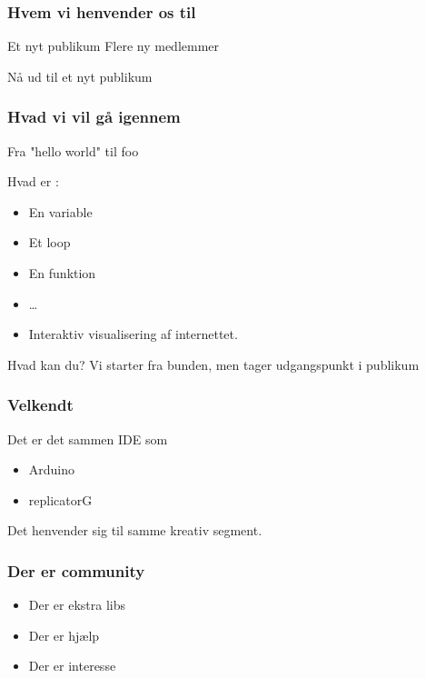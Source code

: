 \documentclass{beamer}
\begin{document}
\begin{frame}
  \frametitle{Hvem vi henvender os til}
  \begin{block}{Et nyt publikum}
    Flere ny medlemmer 

    Nå ud til et nyt publikum

\end{block}
  
\end{frame}

\begin{frame}
  \frametitle{Hvad vi vil gå igennem}
  Fra "hello world" til foo

  Hvad er :
  \begin{itemize}
  \item En variable
  \item Et loop
  \item En funktion
  \item \ldots{}
  \item Interaktiv visualisering af internettet.
  \end{itemize}
  
  \begin{block}{Hvad kan du?}
    Vi starter fra bunden, men tager udgangspunkt i publikum
  \end{block}


\end{frame}


\begin{frame}
  \frametitle{Velkendt}
   Det er det sammen IDE som
   \begin{itemize}
   \item Arduino
   \item replicatorG
   \end{itemize}

   Det henvender sig til samme kreativ segment.

 \end{frame}
 
 \begin{frame}
   \frametitle{Der er community}
   
   \begin{itemize}
   \item Der er ekstra libs
   \item Der er hjælp
   \item Der er interesse
   \end{itemize}
   
 \end{frame}
 
\end{document}
